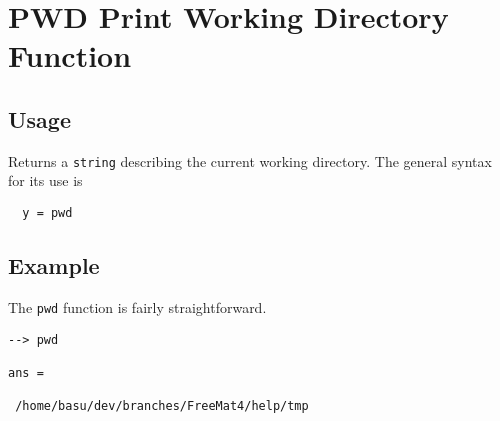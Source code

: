 \section{PWD Print Working Directory Function}

\subsection{Usage}

Returns a \verb|string| describing the current working directory.  The general syntax for its use is
\begin{verbatim}
  y = pwd
\end{verbatim}

\subsection{Example}

The \verb|pwd| function is fairly straightforward.
\begin{verbatim}
--> pwd

ans = 

 /home/basu/dev/branches/FreeMat4/help/tmp
\end{verbatim}
